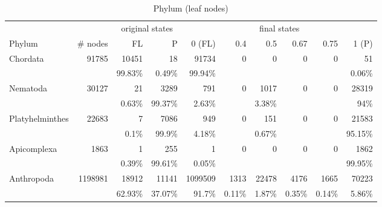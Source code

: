     
      \begin{table}
        \begin{center}
          \hspace*{-1cm}\begin{tabular}{ |l|r||r|r||r|r|r|r|r|r| }
            \hline
            & & \multicolumn{2}{c||}{original states} & \multicolumn{6}{c|}{final states} \\
            Phylum & \# nodes & FL & P
              & 0 (FL) & 0.4 & 0.5 & 0.67 & 0.75 & 1 (P) \\
            \hline \hline
            Chordata & 91785 & 10451 & 18 
              & 91734 & 0 & 0 & 0 & 0 & 51 \\
            & & 99.83\% & 0.49\%
              & 99.94\% & & & & & 0.06\% \\ \hline
            Nematoda & 30127 & 21 & 3289 
              & 791 & 0 & 1017 & 0 & 0 & 28319 \\
            & & 0.63\% & 99.37\%
              & 2.63\% & & 3.38\% & & & 94\% \\ \hline
            Platyhelminthes & 22683 & 7 & 7086 
              & 949 & 0 & 151 & 0 & 0 & 21583 \\
            & & 0.1\% & 99.9\%
              & 4.18\% & & 0.67\% & & & 95.15\% \\ \hline
            Apicomplexa & 1863 & 1 & 255 
              & 1 & 0 & 0 & 0 & 0 & 1862 \\
            & & 0.39\% & 99.61\%
              & 0.05\% & & & & & 99.95\% \\
            \hline \hline
            Anthropoda & 1198981 & 18912 & 11141 
              & 1099509 & 1313 & 22478 & 4176 & 1665 & 70223 \\
            & & 62.93\% & 37.07\%
              & 91.7\% & 0.11\% & 1.87\% & 0.35\% & 0.14\% & 5.86\% \\
            \hline
          \end{tabular} 
        \end{center}
        \caption{Phylum (leaf nodes)}
        \label{table:phylum leaf nodes states} 
      \end{table}

       \\


